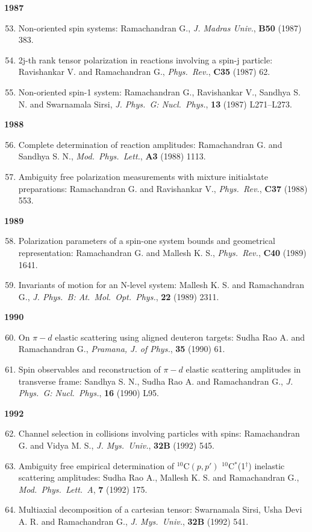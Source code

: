 \textbf{1987}
\begin{enumerate}
\setcounter{enumi}{52}
\item Non-oriented spin systems: Ramachandran G., \textit{J. Madras Univ.}, {\bf B50} (1987) 383.
\item 2j-th rank tensor polarization in reactions involving a spin-j particle: Ravishankar V. and Ramachandran G., \textit{Phys.\ Rev.}, {\bf C35} (1987) 62.
\item Non-oriented spin-1 system: Ramachandran G., Ravishankar V., Sandhya S. N. and Swarnamala Sirsi, \textit{J. Phys.\ G: Nucl.\ Phys.}, {\bf 13} (1987) L271--L273.
\end{enumerate}
\textbf{1988}
\begin{enumerate}
\setcounter{enumi}{55}
\item Complete determination of reaction amplitudes: Ramachandran G. and Sandhya S. N., \textit{Mod.\ Phys.\ Lett.}, {\bf A3} (1988) 1113.
\item Ambiguity free polarization measurements with mixture initial\break state preparations: Ramachandran G. and Ravishankar V., \textit{Phys.\ Rev.}, {\bf C37} (1988) 553.
\end{enumerate}
\textbf{1989}
\begin{enumerate}
\setcounter{enumi}{57}
\item Polarization parameters of a spin-one system bounds and geometrical representation: Ramachandran G. and Mallesh K. S., \textit{Phys.\ Rev.}, {\bf C40} (1989) 1641.
\item Invariants of motion for an N-level system: Mallesh K. S. and Ramachandran G., \textit{J. Phys.\ B: At.\ Mol.\ Opt.\ Phys.}, {\bf 22} (1989) 2311.
\end{enumerate}
\textbf{1990}
\begin{enumerate}
\setcounter{enumi}{59}
\item On $\pi-d$ elastic scattering using aligned deuteron targets: Sudha Rao A. and Ramachandran G., \textit{Pramana, J. of Phys.}, {\bf 35} (1990) 61.
\item Spin observables and reconstruction of $\pi-d$ elastic scattering amplitudes in transverse frame: Sandhya S. N., Sudha Rao A. and Ramachandran G., \textit{J. Phys.\ G: Nucl.\ Phys.}, {\bf 16} (1990) L95.
\end{enumerate}
\textbf{1992}
\begin{enumerate}
\setcounter{enumi}{61}
\item Channel selection in collisions involving particles with spins: Ramachandran G. and Vidya M. S., \textit{J. Mys.\ Univ.}, {\bf 32B} (1992) 545.
\item Ambiguity free empirical determination of $^{10}$C$(p, p')$ $^{10}$C$^{*}$(1$^{\dagger}$) inelastic scattering amplitudes: Sudha Rao A., Mallesh K. S. and Ramachandran G., \textit{Mod.\ Phys.\ Lett.\ A}, {\bf 7} (1992) 175.
\item Multiaxial decomposition of a cartesian tensor: Swarnamala Sirsi, Usha Devi A. R. and Ramachandran G., \textit{J. Mys.\ Univ.}, {\bf 32B} (1992) 541.
\end{enumerate}
